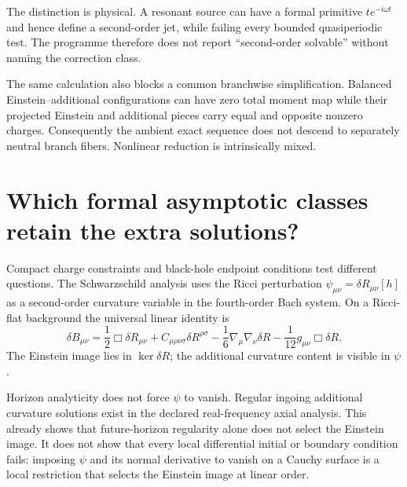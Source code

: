 \documentclass[11pt]{article}
\begin{document}
The distinction is physical.  A resonant source can have a formal primitive
$t e^{-i\omega t}$ and hence define a second-order jet, while failing every
bounded quasiperiodic test.  The programme therefore does not report
``second-order solvable'' without naming the correction class.

The same calculation also blocks a common branchwise simplification.
Balanced Einstein--additional configurations can have zero total moment map
while their projected Einstein and additional pieces carry equal and
opposite nonzero charges.  Consequently the ambient exact sequence does not
descend to separately neutral branch fibers.  Nonlinear reduction is
intrinsically mixed.

\section{Which formal asymptotic classes retain the extra solutions?}

Compact charge constraints and black-hole endpoint conditions test different
questions.  The Schwarzschild analysis uses the Ricci perturbation
$\psi_{\mu\nu}=\delta R_{\mu\nu}[h]$ as a second-order curvature variable in
the fourth-order Bach system.  On a Ricci-flat background the universal
linear identity is
\begin{equation}
 \delta B_{\mu\nu}
 =\frac12\Box\delta R_{\mu\nu}
  +C_{\mu\rho\nu\sigma}\delta R^{\rho\sigma}
  -\frac16\nabla_\mu\nabla_\nu\delta R
  -\frac1{12}g_{\mu\nu}\Box\delta R.
 \label{eq:ricci-bach}
\end{equation}
The Einstein image lies in $\ker\delta R$; the additional curvature content
is visible in $\psi$.

Horizon analyticity does not force $\psi$ to vanish.  Regular ingoing
additional curvature solutions exist in the declared real-frequency axial
analysis.  This already shows that future-horizon regularity alone does not
select the Einstein image.  It does not show that every local differential
initial or boundary condition fails: imposing $\psi$ and its normal
derivative to vanish on a Cauchy surface is a local restriction that selects
the Einstein image at linear order.
\end{document}
